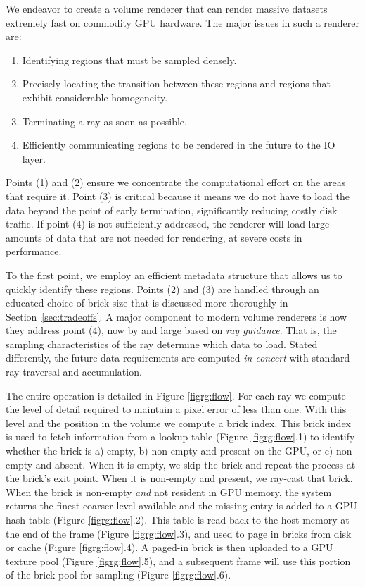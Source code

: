 We endeavor to create a volume renderer that can render massive 
datasets extremely fast on commodity GPU hardware.  The major issues in
such a renderer are:
\begin{enumerate}
  \itemsep0em
  \item Identifying regions that must be sampled densely.

  \item Precisely locating the transition between these regions and
  regions that exhibit considerable homogeneity.

  \item Terminating a ray as soon as possible.

  \item Efficiently communicating regions to be rendered in the future
  to the IO layer.

\end{enumerate}

Points (1) and (2) ensure we concentrate the computational effort on
the areas that require it.  Point (3) is critical because it means we
do not have to load the data beyond the point of early termination,
significantly reducing costly disk traffic.  If point (4) is not
sufficiently addressed, the renderer will load large amounts of data
that are not needed for rendering, at severe costs in performance.


To the first point, we employ an efficient metadata structure that
allows us to quickly identify these regions.  Points (2) and (3) are
handled through an educated choice of brick size that is discussed
more thoroughly in Section~\ref{sec:tradeoffs}.  A major component to
modern volume renderers is how they address point (4), now by and large
based on \emph{ray guidance}.  That is, the sampling characteristics of
the ray determine which data to load.  Stated differently, the future
data requirements are computed \emph{in concert} with standard ray
traversal and accumulation.

The entire operation is detailed in Figure \ref{figrg:flow}. For each
ray we compute the level of detail required to maintain a pixel error
of less than one. With this level and the position in the volume we
compute a brick index.  This brick index is used to fetch information
from a lookup table
(Figure \ref{figrg:flow}.1) to identify whether the brick is a) empty, b)
non-empty and present on the GPU, or c) non-empty and absent. When it
is empty, we skip the brick and repeat the process at the brick's exit
point.  When it is non-empty and present, we ray-cast that brick. When
the brick is non-empty \emph{and} not resident in GPU memory, the
system returns the finest coarser level available and the missing entry
is added to a GPU hash table (Figure
\ref{figrg:flow}.2). This table is read back to the host memory at the
end of the frame (Figure \ref{figrg:flow}.3), and used to page in bricks
from
disk or cache (Figure \ref{figrg:flow}.4).  A paged-in brick is then
uploaded to a GPU texture pool
(Figure \ref{figrg:flow}.5), and a subsequent frame will use this
portion of the brick pool for sampling (Figure \ref{figrg:flow}.6).


